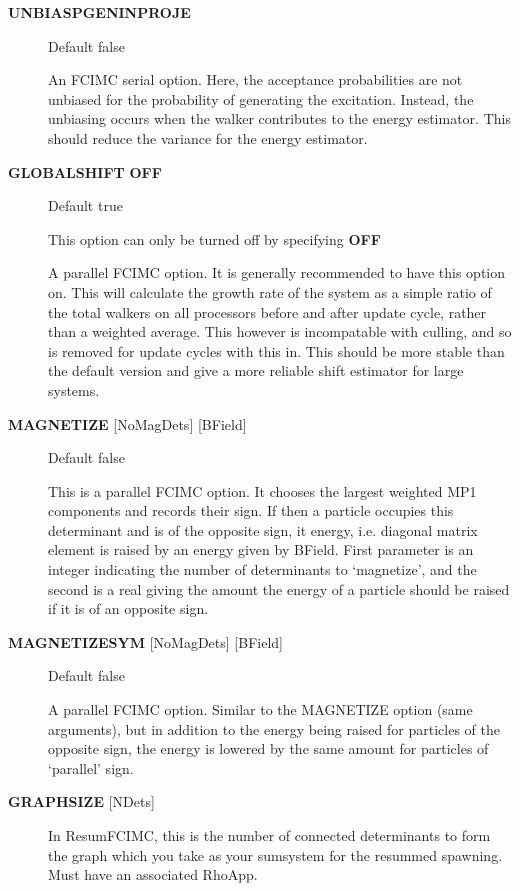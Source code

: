 \documentclass[openany,a4paper,10pt,english]{manual}
\begin{document}
\begin{description}
\item[\textbf{UNBIASPGENINPROJE}] \leavevmode
Default false

An FCIMC serial option. Here, the acceptance probabilities are not unbiased for
the probability of generating the excitation. Instead, the unbiasing occurs when the
walker contributes to the energy estimator. This should reduce the variance for the
energy estimator.

\item[\textbf{GLOBALSHIFT} \textbf{OFF}] \leavevmode
Default true

This option can only be turned off by specifying \textbf{OFF}

A parallel FCIMC option. It is generally recommended to have this option on. This will
calculate the growth rate of the system as a simple ratio of the total walkers on all processors
before and after update cycle, rather than a weighted average. This however is incompatable with culling, and so
is removed for update cycles with this in. This should be more stable than the
default version and give a more reliable shift estimator for large systems.

\item[\textbf{MAGNETIZE} {[}NoMagDets{]} {[}BField{]}] \leavevmode
Default false

This is a parallel FCIMC option. It chooses the largest weighted MP1 components and records their
sign. If then a particle occupies this determinant and is of the opposite sign, it energy,
i.e. diagonal matrix element is raised by an energy given by BField. First parameter is an
integer indicating the number of determinants to `magnetize', and the second is a real
giving the amount the energy of a particle should be raised if it is of an opposite sign.

\item[\textbf{MAGNETIZESYM} {[}NoMagDets{]} {[}BField{]}] \leavevmode
Default false

A parallel FCIMC option. Similar to the MAGNETIZE option (same arguments), but in addition to
the energy being raised for particles of the opposite sign, the energy is lowered by the same
amount for particles of `parallel' sign.

\item[\textbf{GRAPHSIZE} {[}NDets{]}] \leavevmode
In ResumFCIMC, this is the number of connected determinants to form the
graph which you take as your sumsystem for the resummed spawning.  Must
have an associated RhoApp.


\end{description}
\end{document}
